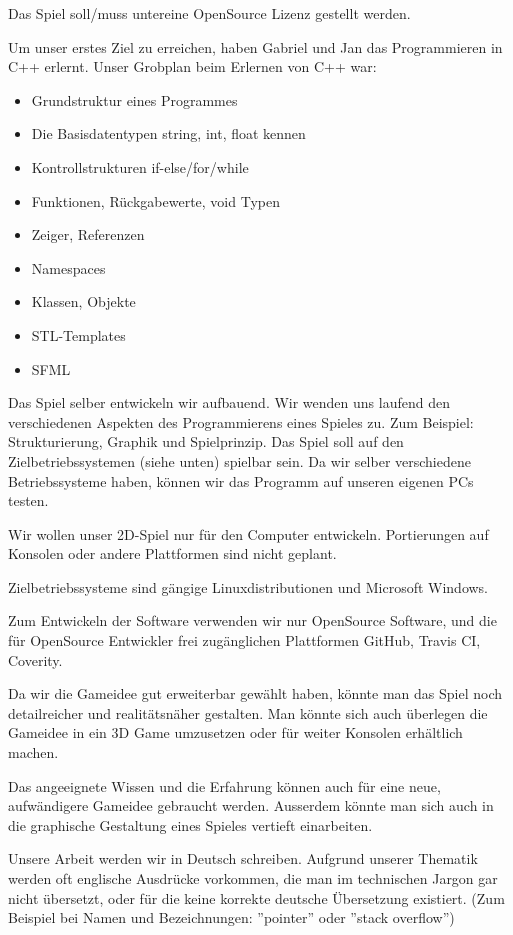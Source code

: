\documentclass[parskip=half]{scrreprt}
\begin{document}
\begin{contract}
Das Spiel soll/muss untereine OpenSource Lizenz gestellt werden.


Um unser erstes Ziel zu erreichen, haben Gabriel und Jan das Programmieren in C++ erlernt. Unser Grobplan beim Erlernen von C++ war:
\begin{itemize}
\item Grundstruktur eines Programmes
\item Die Basisdatentypen string, int, float kennen
\item Kontrollstrukturen if-else/for/while
\item Funktionen, Rückgabewerte, void Typen
\item Zeiger, Referenzen
\item Namespaces
\item Klassen, Objekte
\item STL-Templates
\item SFML
\end{itemize}

Das Spiel selber entwickeln wir aufbauend. Wir wenden uns laufend den verschiedenen Aspekten des Programmierens eines Spieles zu. Zum Beispiel: Strukturierung, Graphik und Spielprinzip. Das Spiel soll auf den Zielbetriebssystemen (siehe unten) spielbar sein. Da wir selber verschiedene Betriebssysteme haben, können wir das Programm auf unseren eigenen PCs testen.


Wir wollen unser 2D-Spiel nur für den Computer entwickeln. Portierungen auf Konsolen oder andere Plattformen sind nicht geplant.

Zielbetriebssysteme sind gängige Linuxdistributionen und Microsoft Windows.

Zum Entwickeln der Software verwenden wir nur OpenSource Software, und die für OpenSource Entwickler frei zugänglichen Plattformen GitHub, Travis CI, Coverity.


Da wir die Gameidee gut erweiterbar gewählt haben, könnte man das Spiel noch detailreicher und realitätsnäher gestalten. Man könnte sich auch überlegen die Gameidee in ein 3D Game umzusetzen oder für weiter Konsolen erhältlich machen.

Das angeeignete Wissen und die Erfahrung können auch für eine neue, aufwändigere Gameidee gebraucht werden. Ausserdem könnte man sich auch in die graphische Gestaltung eines Spieles vertieft einarbeiten.


Unsere Arbeit werden wir in Deutsch schreiben. Aufgrund unserer Thematik werden oft englische Ausdrücke vorkommen, die man im technischen Jargon gar nicht übersetzt, oder für die keine korrekte deutsche Übersetzung existiert. (Zum Beispiel bei Namen und Bezeichnungen: ''pointer'' oder ''stack overflow'')



\end{contract}
\end{document}
